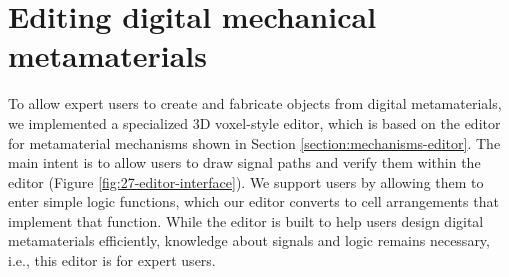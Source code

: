 


\section{Editing digital mechanical metamaterials}

To allow expert users to create and fabricate objects from digital metamaterials, we implemented a specialized 3D voxel-style editor, which is based on the editor for metamaterial mechanisms shown in Section \ref{section:mechanisms-editor}. The main intent is to allow users to draw signal paths and verify them within the editor (Figure \ref{fig:27-editor-interface}). We support users by allowing them to enter simple logic functions, which our editor converts to cell arrangements that implement that function.
While the editor is built to help users design digital metamaterials efficiently, knowledge about signals and logic remains necessary, i.e., this editor is for expert users. 


